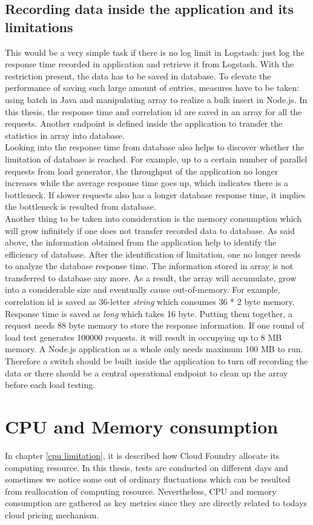   \subsection{Recording data inside the application and its limitations}
This would be a very simple task if there is no log limit in Logstash: just log the response time recorded in application and retrieve it from Logstash. With the restriction present, the data has to be saved in database. To elevate the performance of saving such large amount of entries, measures have to be taken: using batch in Java and manipulating array to realize a bulk insert in Node.js. In this thesis, the response time and correlation id are saved in an array for all the requests. Another endpoint is defined inside the application to transfer the statistics in array into database.\\
Looking into the response time from database also helps to discover whether the limitation of database is reached. For example, up to a certain number of parallel requests from load generator, the throughput of the application no longer increases while the average response time goes up, which indicates there is a bottleneck. If slower requests also has a longer database response time, it implies the bottleneck is resulted from database. \\
Another thing to be taken into consideration is the memory consumption which will grow infinitely if one does not transfer recorded data to database. As said above, the information obtained from the application help to identify the efficiency of database. After the identification of limitation, one no longer needs to analyze the database response time. The information stored in array is not transferred to database any more. As a result, the array will accumulate, grow into a considerable size and eventually cause out-of-memory. For example, correlation id is saved as 36-letter \textit{string} which consumes 36 * 2 byte memory. Response time is saved as \textit{long} which takes 16 byte. Putting them together, a request needs 88 byte memory to store the response information. If one round of load test generates 100000 requests. it will result in occupying up to 8 MB memory. A Node.js application as a whole only needs maximum 100 MB to run. Therefore a switch should be built inside the application to turn off recording the data or there should be a central operational endpoint to clean up the array before each load testing. 
\section{CPU and Memory consumption}
In chapter \ref{cpu limitation}, it is described how Cloud Foundry allocate its computing resource. In this thesis, tests are conducted on different days and sometimes we notice some out of ordinary fluctuations which can be resulted from reallocation of computing resource. Nevertheless, CPU and memory consumption are gathered as key metrics since they are directly related to todays cloud pricing mechanism.
